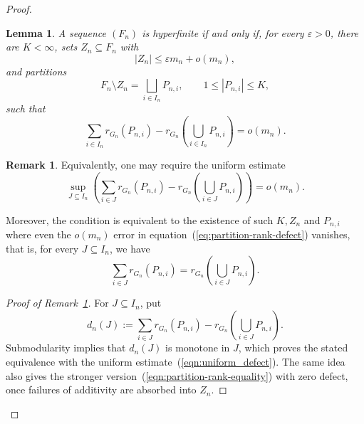 \documentclass{article}
\theoremstyle{plain}
\newtheorem{lem}[thm]{Lemma}
\theoremstyle{definition}
\newtheorem{rem}[thm]{Remark}
\newcommand{\eps}{\varepsilon}
\begin{document}
\begin{proof}
\begin{lem}\label{lem:hyperfinite-rank-partitions}
A sequence $(F_n)$ is hyperfinite if and only if, for every $\eps>0$, there are $K<\infty$, sets $Z_n\subseteq F_n$ with
\[
    |Z_n|\leq \eps m_n + o(m_n),
\]
and partitions
\[
    F_n\setminus Z_n=\bigsqcup_{i\in I_n}P_{n,i},
    \qquad 1\leq |P_{n,i}|\leq K,
\]
such that
\begin{equation}\label{eq:partition-rank-defect}
    \sum_{i\in I_n}r_{G_n}(P_{n,i})
    -r_{G_n}\left(\bigcup_{i\in I_n}P_{n,i}\right)
    =o(m_n).
\end{equation}
\end{lem}

\begin{rem}\label{rem:hyperfinite-rank-partitions}
Equivalently, one may require the uniform estimate
\begin{equation} \label{eqn:uniform_defect}
    \sup_{J\subseteq I_n}
    \left(
        \sum_{i\in J}r_{G_n}(P_{n,i})
        -r_{G_n}\left(\bigcup_{i\in J}P_{n,i}\right)
    \right)
    =o(m_n).
\end{equation}

Moreover, the condition is equivalent to the existence of such $K, Z_n$ and $P_{n,i}$ where even the $o(m_n)$ error in equation~(\ref{eq:partition-rank-defect}) vanishes, that is, for every $J \subseteq I_n$, we have
\begin{equation}\label{eqn:partition-rank-equality}
    \sum_{i\in J}r_{G_n}(P_{n,i})
    =r_{G_n}\left(\bigcup_{i\in J}P_{n,i}\right).
\end{equation}
\end{rem}

\begin{proof}[Proof of Remark~\ref{rem:hyperfinite-rank-partitions}]

For $J\subseteq I_n$, put
    \[
        d_n(J):=\sum_{i\in J}r_{G_n}(P_{n,i})
        -r_{G_n}\left(\bigcup_{i\in J}P_{n,i}\right).
    \]
Submodularity implies that $d_n(J)$  is monotone in $J$, which proves the stated equivalence with the uniform estimate~(\ref{eqn:uniform_defect}). The same idea also gives the stronger version~(\ref{eqn:partition-rank-equality}) with zero defect, once failures of additivity are absorbed into $Z_n$. 


\end{proof}
\end{proof}
\end{document}

